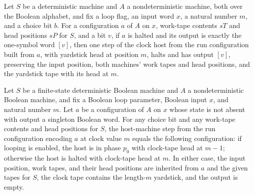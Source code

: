\begin{theorem}
\label{Turing.ClockHost.timeout_success}
\leanok
{}
Let $S$ be a deterministic machine and $A$ a nondeterministic machine, both over the
Boolean alphabet, and fix a loop flag, an input word $x$, a natural number $m$, and a
choice bit $b$. For a configuration $a$ of $A$ on $x$, work-tape contents $sT$ and head
positions $sP$ for $S$, and a bit $v$, if $a$ is halted and its output is exactly the
one-symbol word $[v]$, then one step of the clock host from the run configuration built
from $a$, with yardstick head at position $m$, halts and has output $[v]$, preserving
the input position, both machines' work tapes and head positions, and the yardstick tape
with its head at $m$.
\end{theorem}

\begin{theorem}
\label{Turing.ClockHost.timeout_fail}
\leanok
{}
Let $S$ be a finite-state deterministic Boolean machine and $A$ a nondeterministic
Boolean machine, and fix a Boolean loop parameter, Boolean input $x$, and natural number
$m$. Let $a$ be a configuration of $A$ on $x$ whose state is not absent with output a
singleton Boolean word. For any choice bit and any work-tape contents and head positions
for $S$, the host-machine step from the run configuration encoding $a$ at clock value
$m$ equals the following configuration: if looping is enabled, the host is in phase
$p_0$ with clock-tape head at $m-1$; otherwise the host is halted with clock-tape head
at $m$. In either case, the input position, work tapes, and their head positions are
inherited from $a$ and the given tapes for $S$, the clock tape contains the length-$m$
yardstick, and the output is empty.
\end{theorem}

